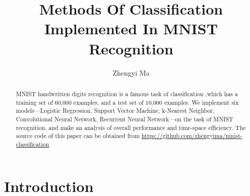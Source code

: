 \documentclass[sigchi]{acmart}
\begin{document}
\title{Methods Of Classification Implemented In MNIST Recognition}


\author{Zhengyi Ma}


\renewcommand{\shortauthors}{Trovato and Tobin, et al.}

\begin{abstract}
 MNIST handwritten digits recognition is a famous task of classification ,which has a training set of 60,000 examples, and a test set of 10,000 examples. We implement six models---Logistic Regression, Support Vector Machine, k-Nearest Neighbor, Convolutional Neural Network, Recurrent Neural Network---on the task of MNIST recognition, and make an analysis of overall performance and time-space efficiency. The source code of this paper can be obtained from \url{https://github.com/zhengyima/mnist-classification}
\end{abstract}





\maketitle

\section{Introduction}
\end{document}
